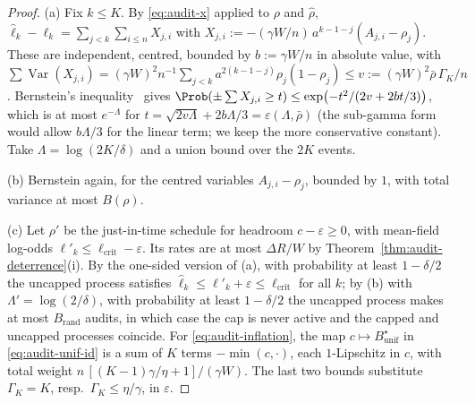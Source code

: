 \begin{proof}
(a) Fix $k\le K$. By \eqref{eq:audit-x} applied to $\rho$ and $\hat\rho$,
$\hat\ell_k-\ell_k=\sum_{j<k}\sum_{i\le n}X_{j,i}$ with
$X_{j,i}:=-(\gamma W/n)\,a^{k-1-j}(A_{j,i}-\rho_j)$. These are independent,
centred, bounded by $b:=\gamma W/n$ in absolute value, with
$\sum\operatorname{Var}(X_{j,i})=(\gamma W)^2n^{-1}\sum_{j<k}a^{2(k-1-j)}\rho_j(1-\rho_j)
\le v:=(\gamma W)^2\bar\rho\,\Gamma_K/n$. Bernstein's
inequality~\cite[Theorem~2.10, to be checked]{boucheron2013concentration} gives
$\Prob(\pm\sum X_{j,i}\ge t)\le\exp\bigl(-t^2/(2v+2bt/3)\bigr)$, which is at most
$e^{-\Lambda}$ for $t=\sqrt{2v\Lambda}+2b\Lambda/3=\varepsilon(\Lambda,\bar\rho)$ (the sub-gamma form would allow $b\Lambda/3$ for the linear term; we keep the more conservative constant).
Take $\Lambda=\log(2K/\delta)$ and a union bound over the $2K$ events.

(b) Bernstein again, for the centred variables $A_{j,i}-\rho_j$, bounded by $1$,
with total variance at most $B(\rho)$.

(c) Let $\rho'$ be the just-in-time schedule for headroom $c-\varepsilon\ge0$,
with mean-field log-odds $\ell'_k\le\ell_{\mathrm{crit}}-\varepsilon$. Its rates
are at most $\Delta R/W$ by Theorem~\ref{thm:audit-deterrence}(i). By the
one-sided version of (a), with probability at least $1-\delta/2$ the uncapped
process satisfies $\hat\ell_k\le\ell'_k+\varepsilon\le\ell_{\mathrm{crit}}$ for
all $k$; by (b) with $\Lambda'=\log(2/\delta)$, with probability at least
$1-\delta/2$ the uncapped process makes at most $B_{\mathrm{rand}}$ audits, in
which case the cap is never active and the capped and uncapped processes
coincide. For \eqref{eq:audit-inflation}, the map
$c\mapsto B^\star_{\mathrm{unif}}$ in \eqref{eq:audit-unif-id} is a sum of
$K$ terms $-\min(c,\cdot)$, each $1$-Lipschitz in $c$, with total weight
$n\,[(K-1)\gamma/\eta+1]/(\gamma W)$. The last two bounds substitute
$\Gamma_K=K$, resp.\ $\Gamma_K\le\eta/\gamma$, in $\varepsilon$.
\end{proof}

